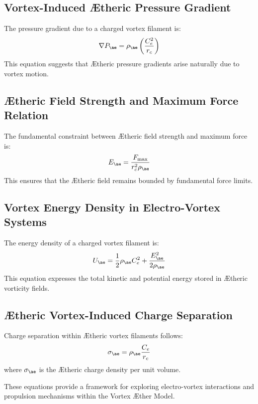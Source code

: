\documentclass[a4paper,12pt]{article}
\begin{document}
\subsection{Vortex-Induced Ætheric Pressure Gradient}
The pressure gradient due to a charged vortex filament is:
\begin{equation}
    \nabla P_{\ae} = \rho_\text{\ae} \left( \frac{C_e^2}{r_c} \right)
\end{equation}
This equation suggests that Ætheric pressure gradients arise naturally due to vortex motion.

\subsection{Ætheric Field Strength and Maximum Force Relation}
The fundamental constraint between Ætheric field strength and maximum force is:
\begin{equation}
    E_{\ae} = \frac{F_{\max}}{r_c^2 \rho_\text{\ae}}
\end{equation}
This ensures that the Ætheric field remains bounded by fundamental force limits.

\subsection{Vortex Energy Density in Electro-Vortex Systems}
The energy density of a charged vortex filament is:
\begin{equation}
    U_{\ae} = \frac{1}{2} \rho_\text{\ae} C_e^2 + \frac{E_{\ae}^2}{2 \rho_\text{\ae}}
\end{equation}
This equation expresses the total kinetic and potential energy stored in Ætheric vorticity fields.

\subsection{Ætheric Vortex-Induced Charge Separation}
Charge separation within Ætheric vortex filaments follows:
\begin{equation}
    \sigma_{\ae} = \rho_\text{\ae} \frac{C_e}{r_c}
\end{equation}
where $\sigma_{\ae}$ is the Ætheric charge density per unit volume.

These equations provide a framework for exploring electro-vortex interactions and propulsion mechanisms within the Vortex Æther Model.

\end{document}
